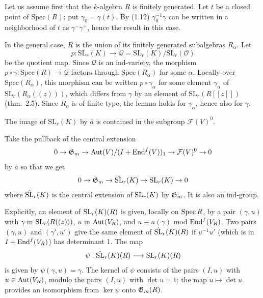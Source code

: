 \documentclass[12pt]{article}
\begin{document}
Let us assume first that the $k$-algebra $R$ is finitely generated. Let $t$ be a closed point of $\text{Spec}(R)$; put $\gamma_0 = \gamma(t)$. By (1.12) $\gamma_0^{-1}\gamma$ can be written in a neighborhood of $t$ as $\gamma^-\gamma^+$, hence the result in this case.

In the general case, $R$ is the union of its finitely generated subalgebras $R_\alpha$. Let \[p: \text{SL}_r(K) \longrightarrow \mathcal{Q} = \text{SL}_r(K)/\text{SL}_r(\mathcal{O})\] be the quotient map. Since $\mathcal{Q}$ is an ind-variety, the morphism $p \circ \gamma: \text{Spec}(R) \rightarrow \mathcal{Q}$ factors through $\text{Spec}(R_\alpha)$ for some $\alpha$. Locally over $\text{Spec}(R_\alpha)$, this morphism can be written $p \circ \gamma_\alpha$ for some element $\gamma_\alpha$ of $\text{SL}_r(R_\alpha((z)))$, which differs from $\gamma$ by an element of $\text{SL}_r(R[[z]])$ (thm.~2.5). Since $R_\alpha$ is of finite type, the lemma holds for $\gamma_\alpha$, hence also for $\gamma$.

\begin{corollary}
    The image of $\text{SL}_r(K)$ by $\bar{a}$ is contained in the subgroup $\mathcal{F}(V)^0$.
\end{corollary}

Take the pullback of the central extension \begin{align*}
    0 \to \mathfrak{G}_m \to \operatorname{Aut}(V)/(I + \operatorname{End}^f(V))_1 \to {\mathcal{F}}(V)^0 \to 0
\end{align*} by $\bar{a}$ so that we get \begin{align*}
    0 \to \mathfrak{G}_m \to \hat{\operatorname{SL}}_r(K) \to \operatorname{SL}_r(K) \to 0
\end{align*} where $\hat{\operatorname{SL}}_r(K)$ is the central extension of $\operatorname{SL}_r(K)$ by $\mathfrak{G}_m$. It is also an ind-group.

Explicitly, an element of $\operatorname{SL}_r(K)(R)$ is given, locally on $\operatorname{Spec} R$, by a pair $(\gamma, u)$ with $\gamma$ in $\operatorname{SL}_r(R((z)))$, $u$ in $\operatorname{Aut}(V_R)$, and $u \equiv a(\gamma)$ mod $\operatorname{End}^f(V_R)$. Two pairs $(\gamma, u)$ and $(\gamma', u')$ give the same element of $\hat{\operatorname{SL}}_r(K)(R)$ if $u^{-1}u'$ (which is in $I + \operatorname{End}^f(V_R)$) has determinant 1. The map \begin{align*}
    \psi: \hat{\operatorname{SL}}_r(K)(R) \longrightarrow \operatorname{SL}_r(K)(R)
\end{align*} is given by $\psi(\gamma, u) = \gamma$. The kernel of $\psi$ consists of the pairs $(I, u)$ with $u \in \operatorname{Aut}(V_R)$, modulo the pairs $(I, u)$ with $\det u = 1$; the map $u \mapsto \det u$ provides an isomorphism from $\ker \psi$ onto $\mathfrak{G}_m(R)$.
\end{document}
